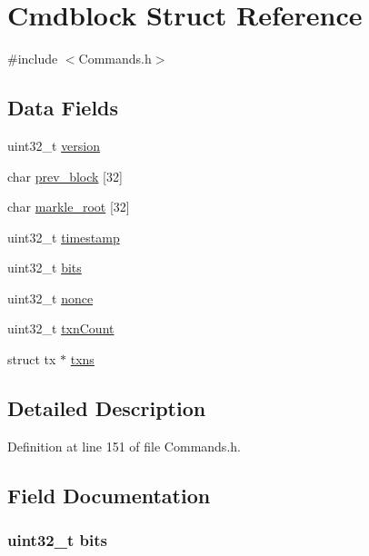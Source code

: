 \hypertarget{struct_cmdblock}{
\section{Cmdblock Struct Reference}
\label{struct_cmdblock}
}


{\ttfamily \#include $<$Commands.h$>$}

\subsection*{Data Fields}
\begin{DoxyCompactItemize}
\item 
uint32\_\-t \hyperlink{struct_cmdblock_acd99bb05ca015e7d74448acb1deba7ca}{version}
\item 
char \hyperlink{struct_cmdblock_a742f80039bbe773ec691c1ce0ae01f95}{prev\_\-block} \mbox{[}32\mbox{]}
\item 
char \hyperlink{struct_cmdblock_a6a88b5c7b1ef72e9ba761f9f8d4525a4}{markle\_\-root} \mbox{[}32\mbox{]}
\item 
uint32\_\-t \hyperlink{struct_cmdblock_ab20b0c7772544cf5d318507f34231fbe}{timestamp}
\item 
uint32\_\-t \hyperlink{struct_cmdblock_afeda3c90a255fe7e4b1e99b4308cce2c}{bits}
\item 
uint32\_\-t \hyperlink{struct_cmdblock_aa2f9785a9d9116cc4592db06375cb887}{nonce}
\item 
uint32\_\-t \hyperlink{struct_cmdblock_abdb4932647cd3ed8e9c289c37834b136}{txnCount}
\item 
struct tx $\ast$ \hyperlink{struct_cmdblock_a4e32cc9ad3444c21452f9445fb3eb9ab}{txns}
\end{DoxyCompactItemize}


\subsection{Detailed Description}


Definition at line 151 of file Commands.h.



\subsection{Field Documentation}
\hypertarget{struct_cmdblock_afeda3c90a255fe7e4b1e99b4308cce2c}{
\subsubsection[{bits}]{\setlength{\rightskip}{0pt plus 5cm}uint32\_\-t {\bf bits}}}
\label{struct_cmdblock_afeda3c90a255fe7e4b1e99b4308cce2c}


